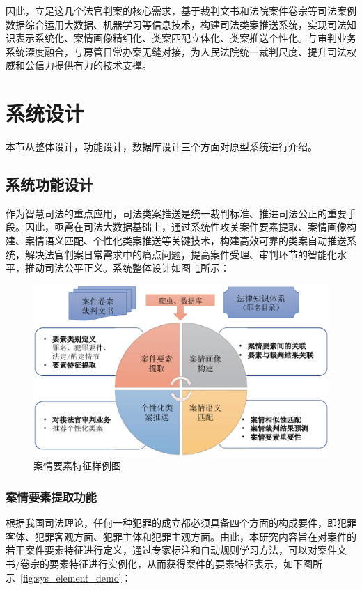 因此，立足这几个法官判案的核心需求，基于裁判文书和法院案件卷宗等司法案例数据综合运用大数据、机器学习等信息技术，构建司法类案推送系统，实现司法知识表示系统化、案情画像精细化、类案匹配立体化、类案推送个性化。与审判业务系统深度融合，与房管日常办案无缝对接，为人民法院统一裁判尺度、提升司法权威和公信力提供有力的技术支撑。

\section{系统设计}
本节从整体设计，功能设计，数据库设计三个方面对原型系统进行介绍。
\subsection{系统功能设计}
作为智慧司法的重点应用，司法类案推送是统一裁判标准、推进司法公正的重要手段。因此，亟需在司法大数据基础上，通过系统性攻关案件要素提取、案情画像构建、案情语义匹配、个性化类案推送等关键技术，构建高效可靠的类案自动推送系统，解决法官判案日常需求中的痛点问题，提高案件受理、审判环节的智能化水平，推动司法公平正义。系统整体设计如图~\ref{fig:sys_main}所示：
\begin{figure}[htbp]%
    \centering
    \includegraphics[scale=0.5, clip=true]{./sources/sys_main.eps}
    \caption{\label{fig:sys_main}案情要素特征样例图}
\end{figure}



\subsubsection{案情要素提取功能}
根据我国司法理论，任何一种犯罪的成立都必须具备四个方面的构成要件，即犯罪客体、犯罪客观方面、犯罪主体和犯罪主观方面。由此，本研究内容旨在对案件的若干案件要素特征进行定义，通过专家标注和自动规则学习方法，可以对案件文书/卷宗的要素特征进行实例化，从而获得案件的要素特征表示，如下图所示~\ref{fig:sys_element_demo}：

